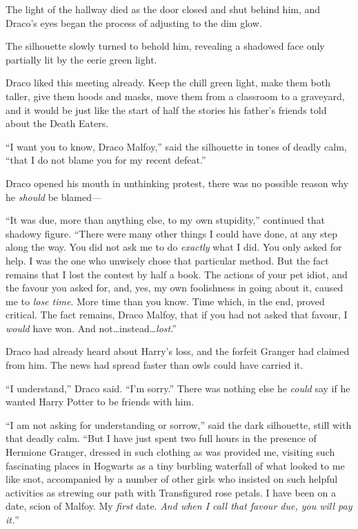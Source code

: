 The light of the hallway died as the door closed and shut behind him, and
Draco’s eyes began the process of adjusting to the dim glow.

The silhouette slowly turned to behold him, revealing a shadowed face only
partially lit by the eerie green light.

Draco liked this meeting already. Keep the chill green light, make them both
taller, give them hoods and masks, move them from a classroom to a graveyard,
and it would be just like the start of half the stories his father’s friends
told about the Death Eaters.

“I want you to know, Draco Malfoy,” said the silhouette in tones of deadly
calm, “that I do not blame you for my recent defeat.”

Draco opened his mouth in unthinking protest, there was no possible reason why
he \emph{should} be blamed—

“It was due, more than anything else, to my own stupidity,” continued that
shadowy figure. “There were many other things I could have done, at any step
along the way. You did not ask me to do \emph{exactly} what I did. You only
asked for help. I was the one who unwisely chose that particular method. But
the fact remains that I lost the contest by half a book. The actions of your
pet idiot, and the favour you asked for, and, yes, my own foolishness in going
about it, caused me to \emph{lose time}. More time than you know. Time which,
in the end, proved critical. The fact remains, Draco Malfoy, that if you had
not asked that favour, I \emph{would} have won. And not…instead…\emph{lost}.”

Draco had already heard about Harry’s loss, and the forfeit Granger had claimed
from him. The news had spread faster than owls could have carried it.

“I understand,” Draco said. “I’m sorry.” There was nothing else he \emph{could}
say if he wanted Harry Potter to be friends with him.

“I am not asking for understanding or sorrow,” said the dark silhouette, still
with that deadly calm. “But I have just spent two full hours in the presence of
Hermione Granger, dressed in such clothing as was provided me, visiting such
fascinating places in Hogwarts as a tiny burbling waterfall of what looked to
me like snot, accompanied by a number of other girls who insisted on such
helpful activities as strewing our path with Transfigured rose petals. I have
been on a date, scion of Malfoy. My \emph{first} date. \emph{And when I call
that favour due, you will pay it.}”

